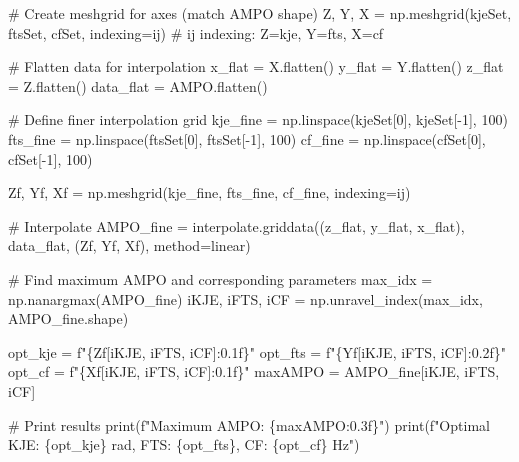 \documentclass[
  11pt,
  a4paper]{article}
\newenvironment{Shaded}{\begin{snugshade}}{\end{snugshade}}
\newcommand{\BuiltInTok}[1]{\textcolor[rgb]{0.00,0.23,0.31}{#1}}
\newcommand{\CommentTok}[1]{\textcolor[rgb]{0.37,0.37,0.37}{#1}}
\newcommand{\DecValTok}[1]{\textcolor[rgb]{0.68,0.00,0.00}{#1}}
\newcommand{\NormalTok}[1]{\textcolor[rgb]{0.00,0.23,0.31}{#1}}
\newcommand{\OperatorTok}[1]{\textcolor[rgb]{0.37,0.37,0.37}{#1}}
\newcommand{\SpecialCharTok}[1]{\textcolor[rgb]{0.37,0.37,0.37}{#1}}
\newcommand{\SpecialStringTok}[1]{\textcolor[rgb]{0.13,0.47,0.30}{#1}}
\newcommand{\StringTok}[1]{\textcolor[rgb]{0.13,0.47,0.30}{#1}}
\begin{document}
\begin{Shaded}
\begin{Highlighting}[]
\CommentTok{\# Create meshgrid for axes (match AMPO shape)}
\NormalTok{Z, Y, X }\OperatorTok{=}\NormalTok{ np.meshgrid(kjeSet, ftsSet, cfSet, indexing}\OperatorTok{=}\StringTok{\textquotesingle{}ij\textquotesingle{}}\NormalTok{)  }\CommentTok{\# ij indexing: Z=kje, Y=fts, X=cf}

\CommentTok{\# Flatten data for interpolation}
\NormalTok{x\_flat }\OperatorTok{=}\NormalTok{ X.flatten()}
\NormalTok{y\_flat }\OperatorTok{=}\NormalTok{ Y.flatten()}
\NormalTok{z\_flat }\OperatorTok{=}\NormalTok{ Z.flatten()}
\NormalTok{data\_flat }\OperatorTok{=}\NormalTok{ AMPO.flatten()}

\CommentTok{\# Define finer interpolation grid}
\NormalTok{kje\_fine }\OperatorTok{=}\NormalTok{ np.linspace(kjeSet[}\DecValTok{0}\NormalTok{], kjeSet[}\OperatorTok{{-}}\DecValTok{1}\NormalTok{], }\DecValTok{100}\NormalTok{)}
\NormalTok{fts\_fine }\OperatorTok{=}\NormalTok{ np.linspace(ftsSet[}\DecValTok{0}\NormalTok{], ftsSet[}\OperatorTok{{-}}\DecValTok{1}\NormalTok{], }\DecValTok{100}\NormalTok{)}
\NormalTok{cf\_fine  }\OperatorTok{=}\NormalTok{ np.linspace(cfSet[}\DecValTok{0}\NormalTok{], cfSet[}\OperatorTok{{-}}\DecValTok{1}\NormalTok{], }\DecValTok{100}\NormalTok{)}

\NormalTok{Zf, Yf, Xf }\OperatorTok{=}\NormalTok{ np.meshgrid(kje\_fine, fts\_fine, cf\_fine, indexing}\OperatorTok{=}\StringTok{\textquotesingle{}ij\textquotesingle{}}\NormalTok{)}

\CommentTok{\# Interpolate}
\NormalTok{AMPO\_fine }\OperatorTok{=}\NormalTok{ interpolate.griddata((z\_flat, y\_flat, x\_flat), data\_flat, (Zf, Yf, Xf), method}\OperatorTok{=}\StringTok{\textquotesingle{}linear\textquotesingle{}}\NormalTok{)}

\CommentTok{\# Find maximum AMPO and corresponding parameters}
\NormalTok{max\_idx }\OperatorTok{=}\NormalTok{ np.nanargmax(AMPO\_fine)}
\NormalTok{iKJE, iFTS, iCF }\OperatorTok{=}\NormalTok{ np.unravel\_index(max\_idx, AMPO\_fine.shape)}

\NormalTok{opt\_kje  }\OperatorTok{=} \SpecialStringTok{f"}\SpecialCharTok{\{}\NormalTok{Zf[iKJE, iFTS, iCF]}\SpecialCharTok{:0.1f\}}\SpecialStringTok{"}
\NormalTok{opt\_fts  }\OperatorTok{=} \SpecialStringTok{f"}\SpecialCharTok{\{}\NormalTok{Yf[iKJE, iFTS, iCF]}\SpecialCharTok{:0.2f\}}\SpecialStringTok{"}
\NormalTok{opt\_cf   }\OperatorTok{=} \SpecialStringTok{f"}\SpecialCharTok{\{}\NormalTok{Xf[iKJE, iFTS, iCF]}\SpecialCharTok{:0.1f\}}\SpecialStringTok{"}
\NormalTok{maxAMPO }\OperatorTok{=}\NormalTok{ AMPO\_fine[iKJE, iFTS, iCF]}

\CommentTok{\# Print results}
\BuiltInTok{print}\NormalTok{(}\SpecialStringTok{f"Maximum AMPO: }\SpecialCharTok{\{}\NormalTok{maxAMPO}\SpecialCharTok{:0.3f\}}\SpecialStringTok{"}\NormalTok{)}
\BuiltInTok{print}\NormalTok{(}\SpecialStringTok{f"Optimal KJE: }\SpecialCharTok{\{}\NormalTok{opt\_kje}\SpecialCharTok{\}}\SpecialStringTok{ rad, FTS: }\SpecialCharTok{\{}\NormalTok{opt\_fts}\SpecialCharTok{\}}\SpecialStringTok{, CF: }\SpecialCharTok{\{}\NormalTok{opt\_cf}\SpecialCharTok{\}}\SpecialStringTok{ Hz"}\NormalTok{)}
\end{Highlighting}
\end{Shaded}
\end{document}
